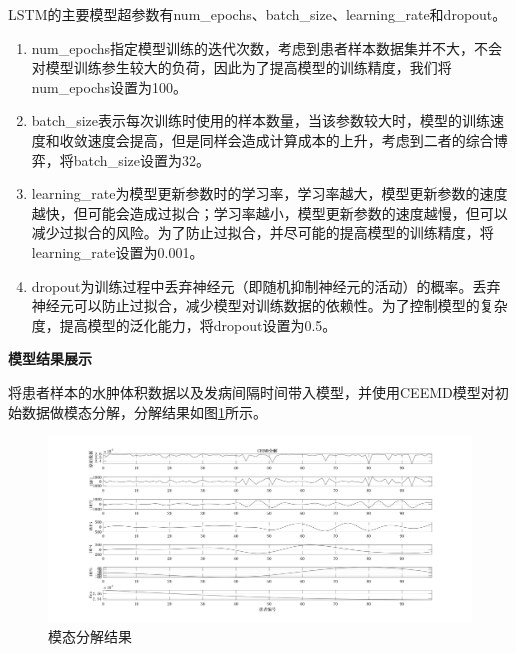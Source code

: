 \documentclass[bwprint]{gmcmthesis}
\begin{document}
LSTM的主要模型超参数有num\_epochs、batch\_size、learning\_rate和dropout。
\begin{enumerate}
    \item num\_epochs指定模型训练的迭代次数，考虑到患者样本数据集并不大，不会对模型训练参生较大的负荷，因此为了提高模型的训练精度，我们将num\_epochs设置为100。
    \item batch\_size表示每次训练时使用的样本数量，当该参数较大时，模型的训练速度和收敛速度会提高，但是同样会造成计算成本的上升，考虑到二者的综合博弈，将batch\_size设置为32。
    \item learning\_rate为模型更新参数时的学习率，学习率越大，模型更新参数的速度越快，但可能会造成过拟合；学习率越小，模型更新参数的速度越慢，但可以减少过拟合的风险。为了防止过拟合，并尽可能的提高模型的训练精度，将learning\_rate设置为0.001。
    \item dropout为训练过程中丢弃神经元（即随机抑制神经元的活动）的概率。丢弃神经元可以防止过拟合，减少模型对训练数据的依赖性。为了控制模型的复杂度，提高模型的泛化能力，将dropout设置为0.5。
\end{enumerate}\par

{\bf 模型结果展示}\par
将患者样本的水肿体积数据以及发病间隔时间带入模型，并使用CEEMD模型对初始数据做模态分解，分解结果如图\ref{fig:模态分解结果}所示。
\begin{figure}[h]
    \centering
    \includegraphics[width = \linewidth]{figures/模态分解结果.png}
    \caption{模态分解结果}
    \label{fig:模态分解结果}
\end{figure}
\end{document}
